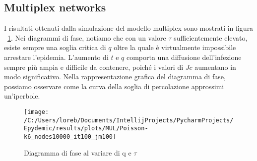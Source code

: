 \subsection{Multiplex networks}\label{subsec:res-multiplex-networks}
    I risultati ottenuti dalla simulazione del modello multiplex sono mostrati in figura ~\ref{fig:diagram_phase}.
    Nei diagrammi di fase, notiamo che con un valore $\tau$ sufficientemente elevato, esiste sempre una soglia critica
    di $q$ oltre la quale è virtualmente impossibile arrestare l'epidemia.
    L'aumento di $t$ e $q$ comporta una diffusione dell'infezione sempre più ampia e difficile da contenere,
    poiché i valori di $Jc$ aumentano in modo significativo.
    Nella rappresentazione grafica del diagramma di fase,
    possiamo osservare come la curva della soglia di percolazione approssimi un'iperbole.

    \begin{figure}[H]
        \texttt{[image: /C:/Users/loreb/Documents/IntellijProjects/PycharmProjects/Epydemic/results/plots/MUL/Poisson-k6\_nodes10000\_it100\_jm100]}\caption{Diagramma di fase al variare di q e $\tau$}
        \label{fig:diagram_phase}
    \end{figure}
